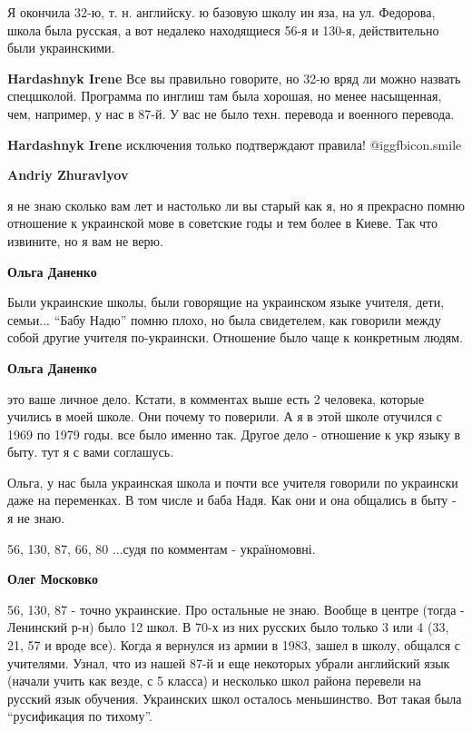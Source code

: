 \begin{itemize}
\begin{itemize}
Я окончила 32-ю, т. н. английску. ю базовую школу ин яза, на ул. Федорова, школа
была русская, а вот недалеко находящиеся 56-я и 130-я, действительно были
украинскими.

\textbf{Hardashnyk Irene} Все вы правильно говорите, но 32-ю вряд ли можно назвать спецшколой. Программа по инглиш там была хорошая, но менее насыщенная, чем, например, у нас в 87-й. У вас не было техн. перевода и военного перевода.

\textbf{Hardashnyk Irene} исключения только подтверждают правила! @igg{fbicon.smile} 

\textbf{Andriy Zhuravlyov} 

я не знаю сколько вам лет и настолько ли вы старый как я, но я прекрасно помню
отношение к украинской мове в советские годы и тем более в Киеве. Так что
извините, но я вам не верю.

\textbf{Ольга Даненко} 

Были украинские школы, были говорящие на украинском языке учителя, дети,
семьи... \enquote{Бабу Надю} помню плохо, но была свидетелем, как говорили между собой
другие учителя по-украински. Отношение было чаще к конкретным людям.

\textbf{Ольга Даненко} 

это ваше личное дело. Кстати, в комментах выше есть 2 человека, которые учились
в моей школе. Они почему то поверили. А я в этой школе отучился с 1969 по 1979
годы. все было именно так. Другое дело - отношение к укр языку в быту. тут я с
вами соглашусь.


Ольга, у нас была украинская школа и почти все учителя говорили по украински
даже на переменках. В том числе и баба Надя. Как они и она общались в быту - я
не знаю.

56, 130, 87, 66, 80 ...судя по комментам - україномовні.

\begin{itemize} %
\textbf{Олег Московко} 

56, 130, 87 - точно украинские. Про остальные не знаю. Вообще в центре (тогда -
Ленинский р-н) было 12 школ. В 70-х из них русских было только 3 или 4 (33, 21,
57 и вроде все). Когда я вернулся из армии в 1983, зашел в школу, общался с
учителями. Узнал, что из нашей 87-й и еще некоторых убрали английский язык
(начали учить как везде, с 5 класса) и несколько школ района перевели на
русский язык обучения. Украинских школ осталось меньшинство. Вот такая была
\enquote{русификация по тихому}.


\end{itemize}
\end{itemize}
\end{itemize}
